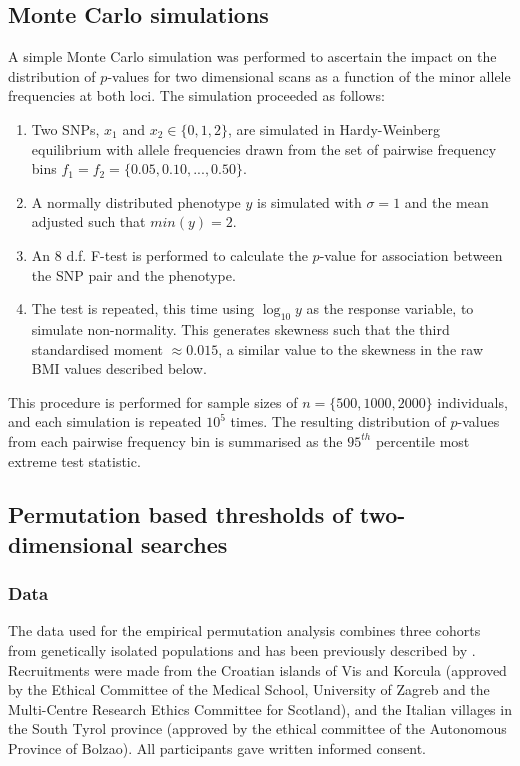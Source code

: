 \subsection{Monte Carlo simulations}

A simple Monte Carlo simulation was performed to ascertain the impact on the distribution of $p$-values for two dimensional scans as a function of the minor allele frequencies at both loci. The simulation proceeded as follows:
\begin{enumerate}
\item Two SNPs, $x_{1}$ and $x_{2} \in \{0, 1, 2\}$, are simulated in Hardy-Weinberg equilibrium with allele frequencies drawn from the set of pairwise frequency bins $f_{1} = f_{2} = \{0.05, 0.10, ..., 0.50\}$.
\item A normally distributed phenotype $y$ is simulated with $\sigma = 1$ and the mean adjusted such that $min(y) = 2$.
\item An 8 d.f. F-test is performed to calculate the $p$-value for association between the SNP pair and the phenotype.
\item The test is repeated, this time using $\log_{10} y$ as the response variable, to simulate non-normality. This generates skewness such that the third standardised moment $\approx 0.015$, a similar value to the skewness in the raw BMI values described below.
\end{enumerate}
This procedure is performed for sample sizes of $n = \{500, 1000, 2000\}$ individuals, and each simulation is repeated $10^5$ times. The resulting distribution of $p$-values from each pairwise frequency bin is summarised as the $95^{th}$ percentile most extreme test statistic.

\subsection{Permutation based thresholds of two-dimensional searches}

\subsubsection{Data} \label{bmi_data}

The data used for the empirical permutation analysis combines three cohorts from genetically isolated populations and has been previously described by \citet{Vitart2008}. Recruitments were made from the Croatian islands of Vis and Korcula (approved by the Ethical Committee of the Medical School, University of Zagreb and the Multi-Centre Research Ethics Committee for Scotland), and the Italian villages in the South Tyrol province (approved by the ethical committee of the Autonomous Province of Bolzao). All participants gave written informed consent.

